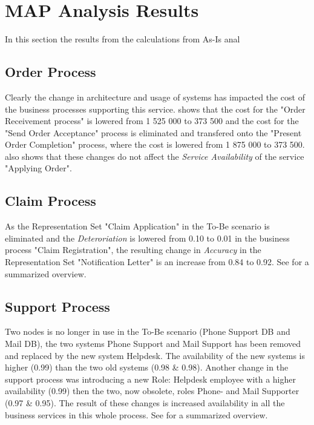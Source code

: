\section{MAP Analysis Results}
\label{sec:map_analysis_results}
In this section the results from the calculations from As-Is anal
\subsection{Order Process}
Clearly the change in architecture and usage of systems has impacted the cost of the business processes supporting this service.  shows that the cost for the "Order Receivement process" is lowered from 1 525 000 to 373 500 and the cost for the "Send Order Acceptance" process is eliminated and transfered onto the "Present Order Completion" process, where the cost is lowered from 1 875 000 to 373 500.  also shows that these changes do not affect the \textsl{Service Availability} of the service "Applying Order".


\subsection{Claim Process}
As the Representation Set "Claim Application" in the To-Be scenario is eliminated and the \textsl{Deteroriation} is lowered from 0.10 to 0.01 in the business process "Claim Registration", the resulting change in \textsl{Accuracy} in the Representation Set "Notification Letter" is an increase from 0.84 to 0.92. See  for a summarized overview.

\subsection{Support Process}
Two nodes is no longer in use in the To-Be scenario (Phone Support DB and Mail DB), the two systems Phone Support and Mail Support has been removed and replaced by the new system Helpdesk. The availability of the new systems is higher (0.99) than the two old systems (0.98 \& 0.98). Another change in the support process was introducing a new Role: Helpdesk employee with a higher availability (0.99) then the two, now obsolete, roles Phone- and Mail Supporter (0.97 \& 0.95). The result of these changes is increased availability in all the business services in this whole process. See  for a summarized overview.


